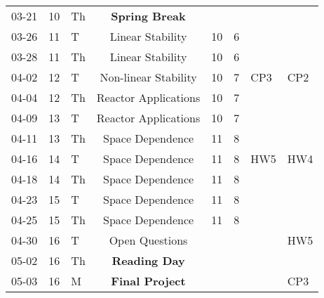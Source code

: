 \documentclass[11pt]{article}
\begin{document}
\begin{table}[h]
\begin{center}
\begin{tabular}{lllcllll}
03-21 & 10 & Th & \textbf{Spring Break} &    &   &      & \\
03-26 & 11 & T  & Linear Stability      & 10 & 6 &      & \\
03-28 & 11 & Th & Linear Stability      & 10 & 6 &      & \\
04-02 & 12 & T  & Non-linear Stability  & 10 & 7 & CP3  & CP2\\
04-04 & 12 & Th & Reactor Applications  & 10 & 7 &      & \\
04-09 & 13 & T  & Reactor Applications  & 10 & 7 &      & \\
04-11 & 13 & Th & Space Dependence      & 11 & 8 &      & \\
04-16 & 14 & T  & Space Dependence      & 11 & 8 & HW5  & HW4\\
04-18 & 14 & Th & Space Dependence      & 11 & 8 &      & \\
04-23 & 15 & T  & Space Dependence      & 11 & 8 &      & \\
04-25 & 15 & Th & Space Dependence      & 11 & 8 &      & \\
04-30 & 16 & T  & Open Questions        &    &   &      & HW5\\
05-02 & 16 & Th & \textbf{Reading Day}  &    &   &      & \\
05-03 & 16 & M & \textbf{Final Project} &    &   &      & CP3 \\
\end{tabular}
\end{center}
\end{table}
\end{document}
